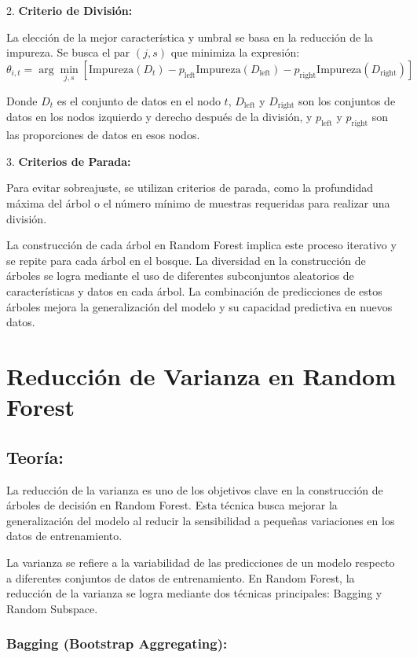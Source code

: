 \documentclass{article}
\begin{document}
2. \textbf{Criterio de División:}

La elección de la mejor característica y umbral se basa en la reducción de la impureza. Se busca el par \((j, s)\) que minimiza la expresión:
\[ \theta_{i,t} = \arg\min_{j, s} \left[ \textrm{Impureza}(D_t) - p_{\textrm{left}}\textrm{Impureza}(D_{\textrm{left}}) - p_{\textrm{right}}\textrm{Impureza}(D_{\textrm{right}}) \right] \]

Donde \(D_t\) es el conjunto de datos en el nodo \(t\), \(D_{\textrm{left}}\) y \(D_{\textrm{right}}\) son los conjuntos de datos en los nodos izquierdo y derecho después de la división, y \(p_{\textrm{left}}\) y \(p_{\textrm{right}}\) son las proporciones de datos en esos nodos.

3. \textbf{Criterios de Parada:}

Para evitar sobreajuste, se utilizan criterios de parada, como la profundidad máxima del árbol o el número mínimo de muestras requeridas para realizar una división.

La construcción de cada árbol en Random Forest implica este proceso iterativo y se repite para cada árbol en el bosque. La diversidad en la construcción de árboles se logra mediante el uso de diferentes subconjuntos aleatorios de características y datos en cada árbol. La combinación de predicciones de estos árboles mejora la generalización del modelo y su capacidad predictiva en nuevos datos.



\section{Reducción de Varianza en Random Forest}

\subsection{Teoría:}

La reducción de la varianza es uno de los objetivos clave en la construcción de árboles de decisión en Random Forest. Esta técnica busca mejorar la generalización del modelo al reducir la sensibilidad a pequeñas variaciones en los datos de entrenamiento.

La varianza se refiere a la variabilidad de las predicciones de un modelo respecto a diferentes conjuntos de datos de entrenamiento. En Random Forest, la reducción de la varianza se logra mediante dos técnicas principales: Bagging y Random Subspace.

\subsubsection{Bagging (Bootstrap Aggregating):}
\end{document}
